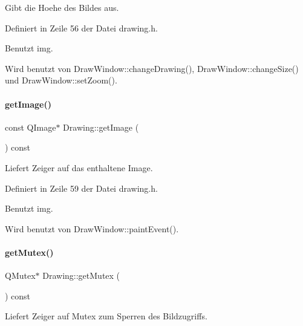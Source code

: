 Gibt die Hoehe des Bildes aus. 



Definiert in Zeile 56 der Datei drawing.\+h.



Benutzt img.



Wird benutzt von Draw\+Window\+::change\+Drawing(), Draw\+Window\+::change\+Size() und Draw\+Window\+::set\+Zoom().

\mbox{\label{classDrawing_a8cdafb9ad4dfd4b54dc40ae753980177}} 
\paragraph{\texorpdfstring{get\+Image()}{getImage()}}
{\footnotesize\ttfamily const Q\+Image$\ast$ Drawing\+::get\+Image (\begin{DoxyParamCaption}{ }\end{DoxyParamCaption}) const\hspace{0.3cm}{\ttfamily [inline]}}



Liefert Zeiger auf das enthaltene Image. 



Definiert in Zeile 59 der Datei drawing.\+h.



Benutzt img.



Wird benutzt von Draw\+Window\+::paint\+Event().

\mbox{\label{classDrawing_ae3d1a4bb0a61a5bd64170abc154dd25c}} 
\paragraph{\texorpdfstring{get\+Mutex()}{getMutex()}}
{\footnotesize\ttfamily Q\+Mutex$\ast$ Drawing\+::get\+Mutex (\begin{DoxyParamCaption}{ }\end{DoxyParamCaption}) const\hspace{0.3cm}{\ttfamily [inline]}}



Liefert Zeiger auf Mutex zum Sperren des Bildzugriffs. 



